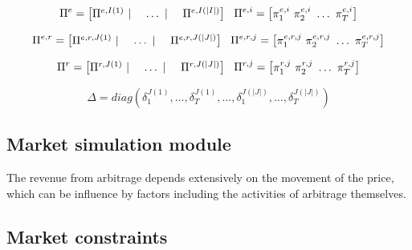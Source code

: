 \begin{equation}
\Pi^e =
\begin{bmatrix}
\Pi^{e,I(1)}~|~&\dots~|~&\Pi^{e,I(|I|)}
\end{bmatrix} ~~~\\
\Pi^{e,i} = 
\begin{bmatrix}
\pi_1^{e,i}~\pi_2^{e,i}~\dots~\pi_T^{e,i}
\end{bmatrix}
\end{equation}

\begin{equation}
\Pi^{e,r} =
\begin{bmatrix}
\Pi^{e,r,J(1)}~|~&\dots~|~&\Pi^{e,r,J(|J|)}
\end{bmatrix} ~~~\\
\Pi^{e,r,j} = 
\begin{bmatrix}
\pi_1^{e,r,j}~\pi_2^{e,r,j}~\dots~\pi_T^{e,r,j}
\end{bmatrix}
\end{equation}

\begin{equation}
\Pi^r =
\begin{bmatrix}
\Pi^{r,J(1)}~|~&\dots~|~&\Pi^{r,J(|J|)}
\end{bmatrix} ~~~\\
\Pi^{r,j} = 
\begin{bmatrix}
\pi_1^{r,j}~\pi_2^{r,j}~\dots~\pi_T^{r,j}
\end{bmatrix}
\end{equation}

\begin{equation}
\label{eq:decision-f-revenue-end}
\Delta = diag (
\delta_1^{J(1)}, \dots , \delta_T^{J(1)}, \dots, \delta_1^{J(|J|)}, \dots, \delta_T^{J(|J|)})
\end{equation}



\subsection{Market simulation module}

The revenue from arbitrage depends extensively on the movement of the price, which can be influence by factors including the activities of arbitrage themselves. 



\subsection{Market constraints}

